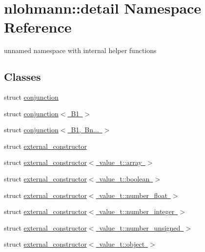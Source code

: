 \hypertarget{namespacenlohmann_1_1detail}{}\section{nlohmann\+::detail Namespace Reference}
\label{namespacenlohmann_1_1detail}


unnamed namespace with internal helper functions  


\subsection*{Classes}
\begin{DoxyCompactItemize}
\item 
struct \mbox{\hyperlink{structnlohmann_1_1detail_1_1conjunction}{conjunction}}
\item 
struct \mbox{\hyperlink{structnlohmann_1_1detail_1_1conjunction_3_01B1_01_4}{conjunction$<$ B1 $>$}}
\item 
struct \mbox{\hyperlink{structnlohmann_1_1detail_1_1conjunction_3_01B1_00_01Bn_8_8_8_01_4}{conjunction$<$ B1, Bn... $>$}}
\item 
struct \mbox{\hyperlink{structnlohmann_1_1detail_1_1external__constructor}{external\+\_\+constructor}}
\item 
struct \mbox{\hyperlink{structnlohmann_1_1detail_1_1external__constructor_3_01value__t_1_1array_01_4}{external\+\_\+constructor$<$ value\+\_\+t\+::array $>$}}
\item 
struct \mbox{\hyperlink{structnlohmann_1_1detail_1_1external__constructor_3_01value__t_1_1boolean_01_4}{external\+\_\+constructor$<$ value\+\_\+t\+::boolean $>$}}
\item 
struct \mbox{\hyperlink{structnlohmann_1_1detail_1_1external__constructor_3_01value__t_1_1number__float_01_4}{external\+\_\+constructor$<$ value\+\_\+t\+::number\+\_\+float $>$}}
\item 
struct \mbox{\hyperlink{structnlohmann_1_1detail_1_1external__constructor_3_01value__t_1_1number__integer_01_4}{external\+\_\+constructor$<$ value\+\_\+t\+::number\+\_\+integer $>$}}
\item 
struct \mbox{\hyperlink{structnlohmann_1_1detail_1_1external__constructor_3_01value__t_1_1number__unsigned_01_4}{external\+\_\+constructor$<$ value\+\_\+t\+::number\+\_\+unsigned $>$}}
\item 
struct \mbox{\hyperlink{structnlohmann_1_1detail_1_1external__constructor_3_01value__t_1_1object_01_4}{external\+\_\+constructor$<$ value\+\_\+t\+::object $>$}}

\end{DoxyCompactItemize}
